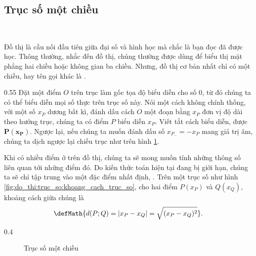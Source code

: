 \subsection{Trục số một chiều}

\ %

Đồ thị là cầu nối đầu tiên giữa đại số và hình học mà chắc là bạn đọc đã được học. Thông thường, nhắc đến đồ thị, chúng thường được dùng để biểu thị mặt phẳng hai chiều hoặc không gian ba chiều. Nhưng, đồ thị cơ bản nhất chỉ có một chiều, hay tên gọi khác là . 

{
   \begin{minipageindent}{0.55\textwidth}
      Đặt một điểm $O$ trên trục làm gốc tọa độ biểu diễn cho số $0$, từ đó chúng ta có thể biểu diễn mọi số thực trên trục số này. Nói một cách không chính thống, với một số $x_P$ dương bất kì, đánh dấu cách $O$ một đoạn bằng $x_P$ đơn vị độ dài theo hướng trục, chúng ta có điểm $P$ biểu diễn $x_P$. Viết tắt cách biểu diễn, được $\bm{P(x_P)}$. Ngược lại, nếu chúng ta muốn đánh dấu số $x_{P_-}=-x_P$ mang giá trị âm, chúng ta dịch ngược lại chiều trục như trên hình \ref{fig:do_thi:truc_so:truc_so_mot_chieu}.
      
      Khi có nhiều điểm ở trên đồ thị, chúng ta sẽ mong muốn tính những thông số liên quan tới những điểm đó. Do kiến thức toán hiện tại đang bị giới hạn, chúng ta sẽ chỉ tập trung vào một đặc điểm nhất định, . Trên một trục số như hình \ref{fig:do_thi:truc_so:khoang_cach_truc_so}, cho hai điểm $P(x_P)$ và $Q(x_Q)$, khoảng cách giữa chúng là $$\defMath{d(P;Q)=|x_P-x_Q|=\sqrt{(x_P-x_Q)^2}}.$$
   \end{minipageindent}
   \hfill
   \begin{minipageindent}{0.4\textwidth}
      \begin{figure}[H]
         \centering
         \caption{Trục số một chiều}
         \label{fig:do_thi:truc_so:truc_so_mot_chieu}
      \end{figure}
      

\end{minipageindent}}
